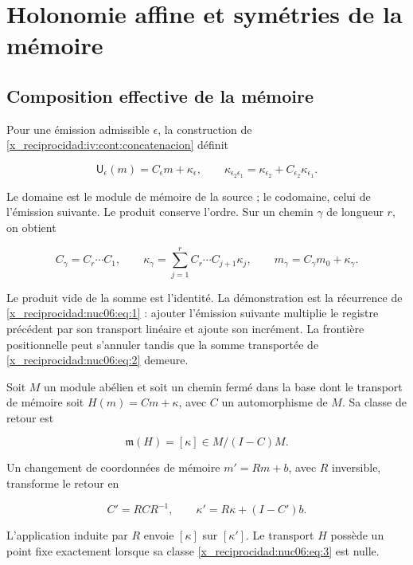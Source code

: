 \chapter{Holonomie affine et symétries de la mémoire}
\label{x_reciprocidad:nuclear:6}
\section{Composition effective de la mémoire}

Pour une émission admissible \(\epsilon\), la construction de \cref{x_reciprocidad:iv:cont:concatenacion} définit

\begin{equation}
\mathsf U_\epsilon(m)=C_\epsilon m+\kappa_\epsilon,
\qquad
\kappa_{\epsilon_2\epsilon_1}
=\kappa_{\epsilon_2}+C_{\epsilon_2}\kappa_{\epsilon_1}.
\label{x_reciprocidad:nuc06:eq:1}
\end{equation}

Le domaine est le module de mémoire de la source ; le codomaine, celui de l’émission suivante. Le produit conserve l’ordre. Sur un chemin \(\gamma\) de longueur \(r\), on obtient

\begin{equation}
C_\gamma=C_r\cdots C_1,\qquad
\kappa_\gamma=\sum_{j=1}^r C_r\cdots C_{j+1}\kappa_j,
\qquad
m_\gamma=C_\gamma m_0+\kappa_\gamma.
\label{x_reciprocidad:nuc06:eq:2}
\end{equation}

Le produit vide de la somme est l’identité. La démonstration est la récurrence de \eqref{x_reciprocidad:nuc06:eq:1} : ajouter l’émission suivante multiplie le registre précédent par son transport linéaire et ajoute son incrément. La frontière positionnelle peut s’annuler tandis que la somme transportée de \eqref{x_reciprocidad:nuc06:eq:2} demeure.

\begin{proposition}

Soit \(M\) un module abélien et soit un chemin fermé dans la base dont le transport de mémoire soit \(H(m)=Cm+\kappa\), avec \(C\) un automorphisme de \(M\). Sa classe de retour est

\begin{equation}
\mathfrak m(H)=[\kappa]\in M/(I-C)M.
\label{x_reciprocidad:nuc06:eq:3}
\end{equation}

Un changement de coordonnées de mémoire \(m'=Rm+b\), avec \(R\) inversible, transforme le retour en

\begin{equation}
C'=RCR^{-1},\qquad
\kappa'=R\kappa+(I-C')b.
\label{x_reciprocidad:nuc06:eq:4}
\end{equation}

L’application induite par \(R\) envoie \([\kappa]\) sur \([\kappa']\). Le transport \(H\) possède un point fixe exactement lorsque sa classe \eqref{x_reciprocidad:nuc06:eq:3} est nulle.
\end{proposition}

